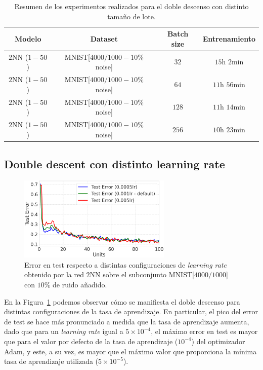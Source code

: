 \begin{table}[h!]
    \centering
    \begin{tabular}{|c|c|c|c|}
    \hline
    \textbf{Modelo}       & \textbf{Dataset} & \textbf{Batch size} & \textbf{Entrenamiento} \\ 
    \hline
    $2$NN ($1-50$)     & MNIST[$4000/1000 - 10$\% noise]      & $32$      & $15$h $2$min         \\ 
    $2$NN ($1-50$)     & MNIST[$4000/1000 - 10$\% noise]      & $64$      & $11$h $56$min         \\ 
    $2$NN ($1-50$)     & MNIST[$4000/1000 - 10$\% noise]      & $128$      & $11$h $14$min         \\ 
    $2$NN ($1-50$)     & MNIST[$4000/1000 - 10$\% noise]      & $256$      & $10$h $23$min         \\
    \hline
    \end{tabular}
    \caption[Resumen de los experimentos realizados para el doble descenso con distinto tamaño de lote.]{Resumen de los experimentos realizados para el doble descenso con distinto tamaño de lote.}\label{tab:dddbatchsizes}
\end{table}

\subsection*{Double descent con distinto learning rate}

\begin{figure}[h!]
    \centering
    \includegraphics[width=0.65\textwidth]{img/experiments/learning_rates_ddd.png}
    \caption[Doble descenso para distinto \textit{learning rate}.]{Error en test respecto a distintas configuraciones de \textit{learning rate} obtenido por la red $2$NN sobre el subconjunto MNIST[$4000/1000$] con $10$\% de ruido añadido.}\label{fig:difflr}
\end{figure}

En la Figura~\ref{fig:difflr} podemos observar cómo se manifiesta el doble descenso para distintas configuraciones de la tasa de aprendizaje. En particular, el pico del error de test se hace más pronunciado a medida que la tasa de aprendizaje aumenta, dado que para un \textit{learning rate} igual a $5 \times 10^{-4}$, el máximo error en test es mayor que para el valor por defecto de la tasa de aprendizaje ($10^{-4}$) del optimizador Adam, y este, a su vez, es mayor que el máximo valor que proporciona la mínima tasa de aprendizaje utilizada ($5 \times 10^{-5}$).

